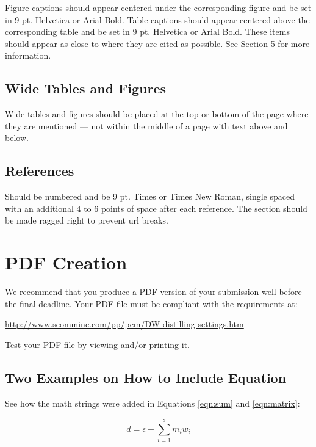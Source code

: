 \documentclass[9pt]{extarticle}
\begin{document}
\begin{multicols}{2}
Figure captions should appear centered under the corresponding figure and be set in 9 pt. Helvetica or Arial Bold.
Table captions should appear centered above the corresponding table and be set in 9 pt. Helvetica or Arial Bold.
These items should appear as close to where they are cited as possible.
See Section 5 for more information.

\subsection{Wide Tables and Figures}

Wide tables and figures should be placed at the top or bottom of the page where they are mentioned — not within the middle of a page with text above and below.

\subsection{References}

Should be numbered and be 9 pt. Times or Times New Roman, single spaced with an additional 4 to 6 points of space after each reference.
The section should be made ragged right to prevent url breaks.


\section{PDF Creation}

We recommend that you produce a PDF version of your submission well before the final deadline.
Your PDF file must be compliant with the requirements at:

\url{http://www.scomminc.com/pp/pcm/DW-distilling-settings.htm}

Test your PDF file by viewing and/or printing it.

\subsection{Two Examples on How to Include Equation}

See how the math strings were added in Equations \ref{eqn:sum} and \ref{eqn:matrix}: %

\begin{equation}
    \label{eqn:sum}
    d = \epsilon + \sum_{i = 1}^{8} m_i w_i
\end{equation}


\end{multicols}
\end{document}
